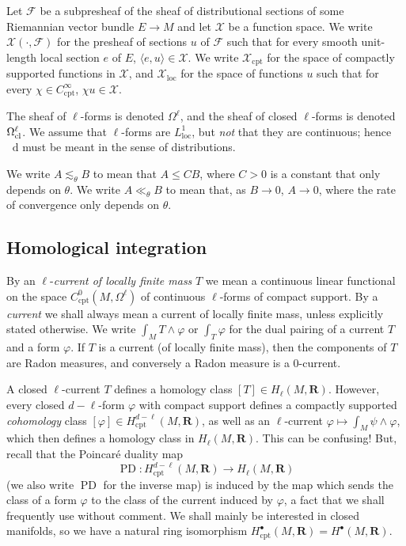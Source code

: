 \documentclass[reqno,11pt]{amsart}
\newcommand{\RR}{\mathbf{R}}
\newcommand*\dif{\mathop{}\!\mathrm{d}}
\DeclareMathOperator{\PD}{PD}
\newcommand{\dfn}[1]{\emph{#1}\index{#1}}
\newcommand{\loc}{\mathrm{loc}}
\newcommand{\cpt}{\mathrm{cpt}}
\theoremstyle{definition}
\numberwithin{equation}{section}
\begin{document}
Let $\mathscr F$ be a subpresheaf of the sheaf of distributional sections of some Riemannian vector bundle $E \to M$ and let $\mathcal X$ be a function space.
We write $\mathcal X(\cdot, \mathscr F)$ for the presheaf of sections $u$ of $\mathscr F$ such that for every smooth unit-length local section $e$ of $E$, $\langle e, u\rangle \in \mathcal X$.
We write $\mathcal X_\cpt$ for the space of compactly supported functions in $\mathcal X$, and $\mathcal X_\loc$ for the space of functions $u$ such that for every $\chi \in C^\infty_\cpt$, $\chi u \in \mathcal X$.

The sheaf of $\ell$-forms is denoted $\Omega^\ell$, and the sheaf of closed $\ell$-forms is denoted $\Omega^\ell_{\rm cl}$.
We assume that $\ell$-forms are $L^1_\loc$, but \emph{not} that they are continuous; hence $\dif$ must be meant in the sense of distributions.

We write $A \lesssim_\theta B$ to mean that $A \leq CB$, where $C > 0$ is a constant that only depends on $\theta$.
We write $A \ll_\theta B$ to mean that, as $B \to 0$, $A \to 0$, where the rate of convergence only depends on $\theta$.

\subsection{Homological integration}
By an $\ell$-\dfn{current of locally finite mass} $T$ we mean a continuous linear functional on the space $C^0_\cpt(M, \Omega^\ell)$ of continuous $\ell$-forms of compact support.
By a \dfn{current} we shall always mean a current of locally finite mass, unless explicitly stated otherwise.
We write $\int_M T \wedge \varphi$ or $\int_T \varphi$ for the dual pairing of a current $T$ and a form $\varphi$.
If $T$ is a current (of locally finite mass), then the components of $T$ are Radon measures, and conversely a Radon measure is a $0$-current.

A closed $\ell$-current $T$ defines a homology class $[T] \in H_\ell(M, \RR)$.
However, every closed $d - \ell$-form $\varphi$ with compact support defines a compactly supported \emph{cohomology} class $[\varphi] \in H^{d - \ell}_\cpt(M, \RR)$, as well as an $\ell$-current $\varphi \mapsto \int_M \psi \wedge \varphi$, which then defines a homology class in $H_\ell(M, \RR)$.
This can be confusing! 
But, recall that the Poincar\'e duality map 
$$\PD: H^{d - \ell}_\cpt(M, \RR) \to H_\ell(M, \RR)$$
(we also write $\PD$ for the inverse map) is induced by the map which sends the class of a form $\varphi$ to the class of the current induced by $\varphi$, a fact that we shall frequently use without comment.
We shall mainly be interested in closed manifolds, so we have a natural ring isomorphism $H^\bullet_\cpt(M, \RR) = H^\bullet(M, \RR)$.
\end{document}

